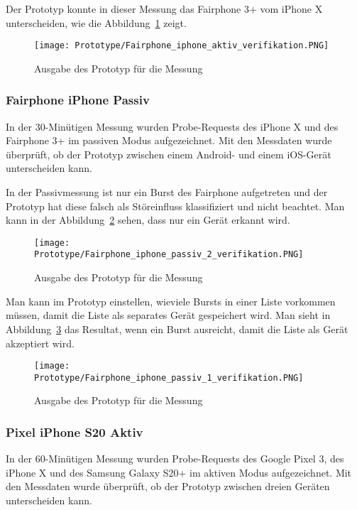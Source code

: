 Der Prototyp konnte in dieser Messung das Fairphone 3+ vom iPhone X unterscheiden,
wie die Abbildung~\ref{figure:fairphoneiphoneactive} zeigt.

\begin{figure}[h!]
	\centering
	\texttt{[image: Prototype/Fairphone\_iphone\_aktiv\_verifikation.PNG]}
    \caption{Ausgabe des Prototyp für die Messung 
	\label{figure:fairphoneiphoneactive}}
\end{figure}


\subsubsection*{Fairphone iPhone Passiv}
In der 30-Minütigen Messung wurden Probe-Requests des iPhone X und des 
Fairphone 3+ im passiven Modus aufgezeichnet. 
Mit den Messdaten wurde überprüft, ob der Prototyp zwischen einem 
Android- und einem iOS-Gerät unterscheiden kann.

In der Passivmessung ist nur ein Burst des Fairphone aufgetreten und der 
Prototyp hat diese falsch als Störeinfluss klassifiziert und 
nicht beachtet.
Man kann in der Abbildung~\ref{figure:fairphoneiphonepassiveone} sehen, 
dass nur ein Gerät erkannt wird.

\begin{figure}[h!]
	\centering
	\texttt{[image: Prototype/Fairphone\_iphone\_passiv\_2\_verifikation.PNG]}
    \caption{Ausgabe des Prototyp für die Messung 
	\label{figure:fairphoneiphonepassiveone}}
\end{figure}

Man kann im Prototyp einstellen, wieviele Bursts in einer Liste vorkommen müssen, 
damit die Liste als separates Gerät gespeichert wird.
Man sieht in Abbildung~\ref{figure:fairphoneiphonepassivetwo} das Resultat, wenn ein Burst ausreicht, 
damit die Liste als Gerät akzeptiert wird.

\begin{figure}[h!]
	\centering
	\texttt{[image: Prototype/Fairphone\_iphone\_passiv\_1\_verifikation.PNG]}
    \caption{Ausgabe des Prototyp für die Messung 
	\label{figure:fairphoneiphonepassivetwo}}
\end{figure}

\clearpage 

\subsubsection*{Pixel iPhone S20 Aktiv}
In der 60-Minütigen Messung wurden Probe-Requests des Google Pixel 3, des iPhone X
und des Samsung Galaxy S20+ im aktiven Modus aufgezeichnet.
Mit den Messdaten wurde überprüft, ob der Prototyp zwischen dreien Geräten 
unterscheiden kann.

